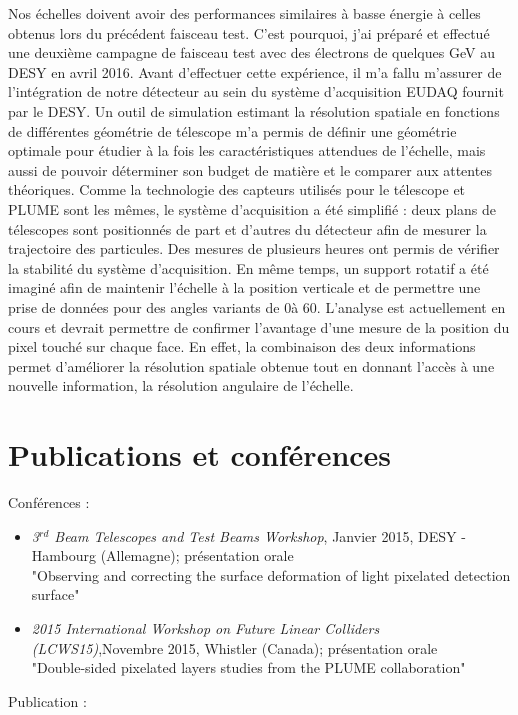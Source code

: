 \documentclass[a4papper, 10pt]{article}
\begin{document}
  Nos échelles doivent avoir des performances similaires à basse énergie à celles obtenus lors du précédent faisceau test.
  C'est pourquoi, j'ai préparé et effectué une deuxième campagne de faisceau test avec des électrons de quelques GeV au DESY en avril 2016.
  Avant d'effectuer cette expérience, il m'a fallu m'assurer de l'intégration de notre détecteur au sein du système d'acquisition EUDAQ fournit par le DESY. 
  Un outil de simulation estimant la résolution spatiale en fonctions de différentes géométrie de télescope m'a permis de définir une géométrie optimale pour étudier à la fois les caractéristiques attendues de l'échelle, mais aussi de pouvoir déterminer son budget de matière et le comparer aux attentes théoriques.
  Comme la technologie des capteurs utilisés pour le télescope et PLUME sont les mêmes, le système d'acquisition a été simplifié : deux plans de télescopes sont positionnés de part et d'autres du détecteur afin de mesurer la trajectoire des particules. 
  Des mesures de plusieurs heures ont permis de vérifier la stabilité du système d'acquisition. 
  En même temps, un support rotatif a été imaginé afin de maintenir l'échelle à la position verticale et de permettre une prise de données pour des angles variants de 0\degre à 60\degre.
  L'analyse est actuellement en cours et devrait permettre de confirmer l'avantage d'une mesure de la position du pixel touché sur chaque face. En effet, la combinaison des deux informations permet d'améliorer la résolution spatiale obtenue tout en donnant l'accès à une nouvelle information, la résolution angulaire de l'échelle.
 
  \section*{Publications et conférences}

  Conférences :
  \begin{itemize}
    \item \textit{3$^{rd}$ Beam Telescopes and Test Beams Workshop}, Janvier 2015, DESY - Hambourg (Allemagne); présentation orale\\
    "Observing and correcting the surface deformation of light pixelated detection surface"
    \item \textit{2015 International Workshop on Future Linear Colliders (LCWS15)},Novembre 2015,  Whistler (Canada); présentation orale\\
    "Double-sided pixelated layers studies from the PLUME collaboration"
  \end{itemize}
  Publication :
  
\end{document}
